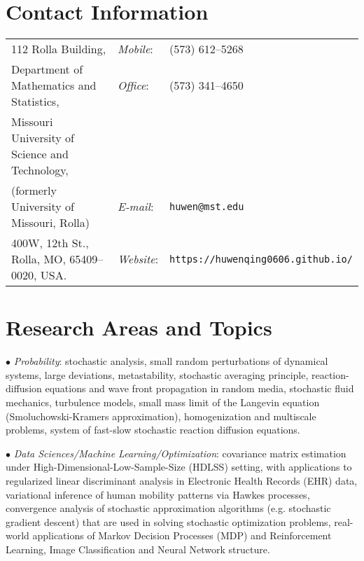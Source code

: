 \documentclass[margin,line]{res}
\begin{document}
\pagestyle{plain}



\begin{resume}
\section{\sc Contact Information}
\vspace{.05in}
\begin{tabular}{@{}p{3in}p{0.45in}p{2in}}
112 Rolla Building,                                 & {\it Mobile}:     & (573) 612--5268                                         \\
Department of Mathematics and Statistics,           & {\it Office}:     & (573) 341--4650                                         \\
Missouri University of Science and Technology,      &                                                                             \\
(formerly University of Missouri, Rolla)            & {\it E-mail}:     & \verb"huwen@mst.edu"                                    \\
400W, 12th St., Rolla, MO, 65409--0020, USA.        & {\it Website}:    & \verb"https://huwenqing0606.github.io/"
\end{tabular}






\section{\sc Research Areas and Topics}

$\bullet$ \textit{Probability}: stochastic analysis, small random perturbations of dynamical systems, large deviations, metastability, stochastic averaging principle, reaction-diffusion equations and wave front propagation in random media, stochastic fluid mechanics, turbulence models, small mass limit of the Langevin equation (Smoluchowski-Kramers approximation), homogenization and multiscale problems, system of fast-slow stochastic reaction diffusion equations.

$\bullet$ \textit{Data Sciences/Machine Learning/Optimization}: covariance matrix estimation under High-Dimensional-Low-Sample-Size (HDLSS) setting, with applications to regularized linear discriminant analysis in Electronic Health Records (EHR) data, variational inference of human mobility patterns via Hawkes processes, convergence analysis of stochastic approximation algorithms (e.g. stochastic gradient descent) that are used in solving stochastic optimization problems, real-world applications of Markov Decision Processes (MDP) and Reinforcement Learning, Image Classification and Neural Network structure.


\end{resume}
\end{document}
